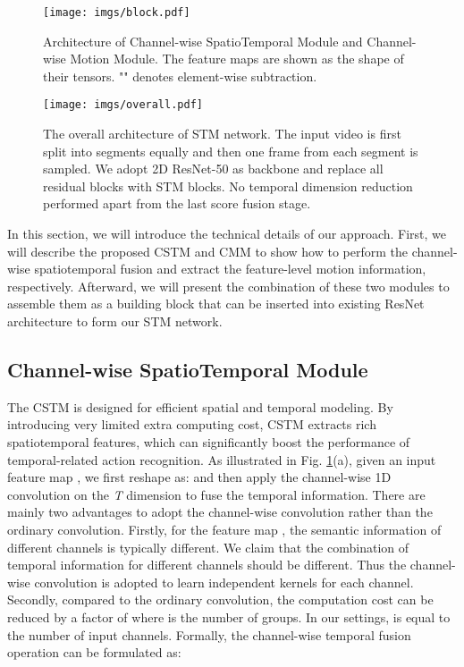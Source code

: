 \documentclass[10pt,twocolumn,letterpaper]{article}
\begin{document}
\begin{figure}[tbp]
		\begin{center}
			\texttt{[image: imgs/block.pdf]}
		\end{center}
		\caption{Architecture of Channel-wise SpatioTemporal Module and Channel-wise Motion Module. The feature maps are shown as the shape of their tensors. "" denotes element-wise subtraction.}
		\label{block}
	\end{figure}
\begin{figure*}[tbp]
		\begin{center}
			\texttt{[image: imgs/overall.pdf]}
			\vspace{-0.5cm}
		\end{center}
		\caption{The overall architecture of STM network. The input video is first split into  segments equally and then one frame from each segment is sampled. We adopt 2D ResNet-50 as backbone and replace all residual blocks with STM blocks. No temporal dimension reduction performed apart from the last score fusion stage.}
		\label{overall}
			\vspace{-0.3cm}
	\end{figure*}

In this section, we will introduce the technical details of our approach. First, we will describe the proposed CSTM and CMM to show how to perform the channel-wise spatiotemporal fusion and extract the feature-level motion information, respectively. Afterward, we will present the combination of these two modules to assemble them as a building block that can be inserted into existing ResNet architecture to form our STM network.
	
	\subsection{Channel-wise SpatioTemporal Module}
	The CSTM is designed for efficient spatial and temporal modeling. By introducing very limited extra computing cost, CSTM extracts rich spatiotemporal features, which can significantly boost the performance of temporal-related action recognition. As illustrated in Fig. \ref{block}(a), given an input feature map , we first reshape  as:  and then apply the channel-wise 1D convolution on the \textit{T} dimension to fuse the temporal information. There are mainly two advantages to adopt the channel-wise convolution rather than the ordinary convolution. Firstly, for the feature map , the semantic information of different channels is typically different. We claim that the combination of temporal information for different channels should be different. Thus the channel-wise convolution is adopted to learn independent kernels for each channel. Secondly, compared to the ordinary convolution, the computation cost can be reduced by a factor of  where  is the number of groups. In our settings,  is equal to the number of input channels. Formally, the channel-wise temporal fusion operation can be formulated as:
\end{document}
